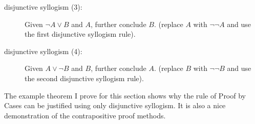 \documentclass[12pt]{article}
\begin{document}
\begin{description}



\item[disjunctive syllogism (3):] Given $\neg A \vee B$ and $A$,
further conclude $B$.  (replace $A$ with $\neg\neg A$ and use the first disjunctive syllogism rule).
\item[disjunctive syllogism (4):] Given $A \vee \neg B$ and  $B$,
further conclude $A$.  (replace $B$ with $\neg\neg B$ and use the second disjunctive syllogism rule).

\end{description}

The example theorem I prove for this section shows why the rule of
Proof by Cases can be justified using only disjunctive syllogism.  It is also a nice demonstration of the
contrapositive proof methods.
\end{document}
